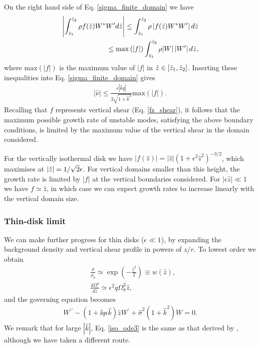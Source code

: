 On the right hand side of Eq. \ref{sigma_finite_domain} we have
\begin{align}
  \left|\int_{\hat{z}_1}^{\hat{z}_2}\rho
    f(\hat{z}) W^*W^\prime d\hat{z}\right|\leq \int_{\hat{z}_1}^{\hat{z}_2}\rho
  \left|f(\hat{z})W^*W^\prime \right|d\hat{z} \notag\\
  \leq
  \mathrm{max}\left(|f|\right)\int_{\hat{z}_1}^{\hat{z}_2}\rho
  |W|\left|W^\prime \right|d\hat{z},
\end{align}
where $\mathrm{max}(|f|)$ is the maximum value of $|f|$ in
$\hat{z}\in[\hat{z}_1,\hat{z}_2]$. Inserting these inequalities into
Eq. \ref{sigma_finite_domain} gives
\begin{align}\label{max_growth}
  |\hat{\nu}|\leq
  \frac{\epsilon |\hat{k} q|}{2\sqrt{1+\hat{k}^2}}\mathrm{max}(|f|). 
\end{align}
Recalling that $f$ represents vertical shear (Eq. \ref{fz_shear}), it
follows that the maximum possible growth rate of unstable modes,
satisfying the above boundary conditions, is limited by the maximum
value of the vertical shear in the domain considered. 

For the vertically isothermal disk we have $|f(\hat{z})| =
|\hat{z}|\left(1+\epsilon^2\hat{z}^2\right)^{-3/2}$, which maximises
at $|\hat{z}|=1/\sqrt{2}\epsilon$. For vertical domains smaller 
than this height, the growth rate is limited by $|f|$ at the vertical
boundaries considered. For $|\epsilon\hat{z}|\ll1$ we have $f\simeq
\hat{z}$, in which case we can expect growth rates to increase linearly
with the vertical domain size.   %



\subsubsection{Thin-disk limit}
We can make further progress for thin disks ($\epsilon\ll1$), 
by expanding the background density and vertical shear profile in powers
of $z/r$. To lowest order we obtain 
\begin{align}
  &\frac{\rho}{\rho_0} \simeq 
  \exp{\left(-\frac{\hat{z}^2}{2}\right)} \equiv w(\hat{z}),\label{thin_dens}\\
  &\frac{d\Omega^2}{d\hat{z}} \simeq \epsilon^2q\Omega_k^2\hat{z}, \label{thin_vshear}
\end{align} 
and the governing equation becomes 
\begin{align}\label{iso_ode3}
  W^{\prime\prime} - \left(1 + \ii q\epsilon
    \hat{k}\right)\hat{z}W^\prime  +
  \hat{\sigma}^2\left(1+\hat{k}^2\right)W = 
  0.
\end{align}
We remark that for large $|\hat{k}|$, Eq. \ref{iso_ode3} is the same as
that derived by \cite{nelson13}, although we have taken a different
route.  

